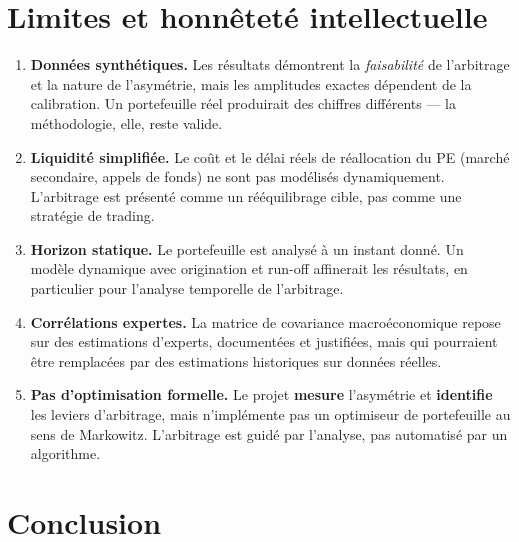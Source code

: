 \documentclass[12pt,a4paper]{article}
\begin{document}
\section{Limites et honnêteté intellectuelle}

\begin{enumerate}[label=\textbf{L\arabic*.}]
  \item \textbf{Données synthétiques.} Les résultats démontrent la \textit{faisabilité} de l'arbitrage et la nature de l'asymétrie, mais les amplitudes exactes dépendent de la calibration. Un portefeuille réel produirait des chiffres différents --- la méthodologie, elle, reste valide.

  \item \textbf{Liquidité simplifiée.} Le coût et le délai réels de réallocation du PE (marché secondaire, appels de fonds) ne sont pas modélisés dynamiquement. L'arbitrage est présenté comme un rééquilibrage cible, pas comme une stratégie de trading.

  \item \textbf{Horizon statique.} Le portefeuille est analysé à un instant donné. Un modèle dynamique avec origination et run-off affinerait les résultats, en particulier pour l'analyse temporelle de l'arbitrage.

  \item \textbf{Corrélations expertes.} La matrice de covariance macroéconomique repose sur des estimations d'experts, documentées et justifiées, mais qui pourraient être remplacées par des estimations historiques sur données réelles.

  \item \textbf{Pas d'optimisation formelle.} Le projet \textbf{mesure} l'asymétrie et \textbf{identifie} les leviers d'arbitrage, mais n'implémente pas un optimiseur de portefeuille au sens de Markowitz. L'arbitrage est guidé par l'analyse, pas automatisé par un algorithme.
\end{enumerate}

\section{Conclusion}
\end{document}
